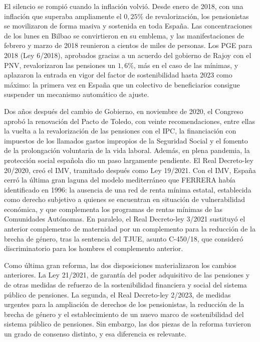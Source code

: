 \documentclass[10pt,a4paper]{article}
\begin{document}
El silencio se rompió cuando la inflación volvió. Desde enero de 2018, con una inflación que superaba ampliamente el $0,25\%$ de revalorización, los pensionistas se movilizaron de forma masiva y sostenida en toda España. Las concentraciones de los lunes en Bilbao se convirtieron en su emblema, y las manifestaciones de febrero y marzo de 2018 reunieron a cientos de miles de personas. Los PGE para 2018 (Ley 6/2018), aprobados gracias a un acuerdo del gobierno de Rajoy con el PNV, revalorizaron las pensiones un $1,6\%$, más en el caso de las mínimas, y aplazaron la entrada en vigor del factor de sostenibilidad hasta 2023 como máximo: la primera vez en España que un colectivo de beneficiarios consigue suspender un mecanismo automático de ajuste. 

Dos años después del cambio de Gobierno, en noviembre de 2020, el Congreso aprobó la renovación del Pacto de Toledo, con veinte recomendaciones, entre ellas la vuelta a la revalorización de las pensiones con el IPC, la financiación con impuestos de los llamados gastos impropios de la Seguridad Social y el fomento de la prolongación voluntaria de la vida laboral. Además, en plena pandemia, la protección social española dio un paso largamente pendiente. El Real Decreto-ley 20/2020, creó el IMV, tramitado después como Ley 19/2021. Con el IMV, España cerró la última gran laguna del modelo mediterráneo que FERRERA había identificado en 1996: la ausencia de una red de renta mínima estatal, establecida como derecho subjetivo a quienes se encuentran en situación de vulnerabilidad económica, y que complementa los programas de rentas mínimas de las Comunidades Autónomas. En paralelo, el Real Decreto-ley 3/2021 sustituyó el anterior complemento de maternidad por un complemento para la reducción de la brecha de género, tras la sentencia del TJUE, asunto C-450/18, que consideró discriminatorio para los hombres el complemento anterior.

Como última gran reforma, las dos disposiciones materializaron los cambios anteriores. La Ley 21/2021, de garantía del poder adquisitivo de las pensiones y de otras medidas de refuerzo de la sostenibilidad financiera y social del sistema público de pensiones. La segunda, el Real Decreto-ley 2/2023, de medidas urgentes para la ampliación de derechos de los pensionistas, la reducción de la brecha de género y el establecimiento de un nuevo marco de sostenibilidad del sistema público de pensiones. Sin embargo, las dos piezas de la reforma tuvieron un grado de consenso distinto, y esa diferencia es relevante. 
\end{document}
